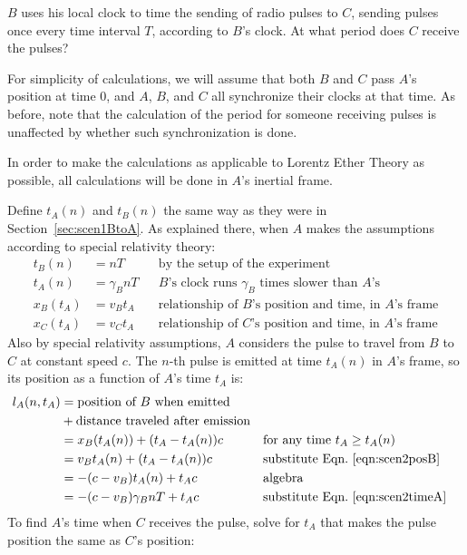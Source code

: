 \documentclass[a4paper]{article}
\theoremstyle{plain}
\theoremstyle{definition}
\begin{document}
$B$ uses his local clock to time the sending of radio pulses to $C$,
sending pulses once every time interval $T$, according to $B$'s clock.
At what period does $C$ receive the pulses?

For simplicity of calculations, we will assume that both $B$ and $C$
pass $A$'s position at time 0, and $A$, $B$, and $C$ all synchronize
their clocks at that time.  As before, note that the calculation of
the period for someone receiving pulses is unaffected by whether such
synchronization is done.

In order to make the calculations as applicable to Lorentz Ether
Theory as possible, all calculations will be done in $A$'s inertial
frame.

Define $t_A(n)$ and $t_B(n)$ the same way as they were in
Section~\ref{sec:scen1BtoA}.  As explained there, when $A$ makes the
assumptions according to special relativity theory:
\begin{align}
t_B(n) & = nT & & \text{by the setup of the experiment} \nonumber \\
t_A(n) & = \gamma_B nT & & \text{$B$'s clock runs $\gamma_B$ times slower than $A$'s} \label{eqn:scen2timeA} \\
x_B(t_A) & = v_B t_A & & \text{relationship of $B$'s position and time, in $A$'s frame} \label{eqn:scen2posB} \\
x_C(t_A) & = v_C t_A & & \text{relationship of $C$'s position and time, in $A$'s frame}
\end{align}
Also by special relativity assumptions, $A$ considers the pulse to
travel from $B$ to $C$ at constant speed $c$.
The $n$-th pulse is emitted at time $t_A(n)$ in $A$'s frame,
so its position as a function of $A$'s time $t_A$ is:
\begin{align*}
l_A(n, t_A)
  & = \text{position of $B$ when emitted} \\
  &   + \text{distance traveled after emission} \\
  & = x_B(t_A(n)) + (t_A - t_A(n)) c & & \text{for any time $t_A \geq t_A(n)$} \\
  & = v_B t_A(n) + (t_A - t_A(n)) c & & \text{substitute Eqn.~\eqref{eqn:scen2posB}} \\
  & = -(c - v_B) t_A(n) + t_A c & & \text{algebra} \\
  & = -(c - v_B) \gamma_B nT + t_A c & & \text{substitute Eqn.~\eqref{eqn:scen2timeA}}
\end{align*}
To find $A$'s time when $C$ receives the pulse,
solve for $t_A$ that makes the pulse position the same as $C$'s position:
\end{document}
